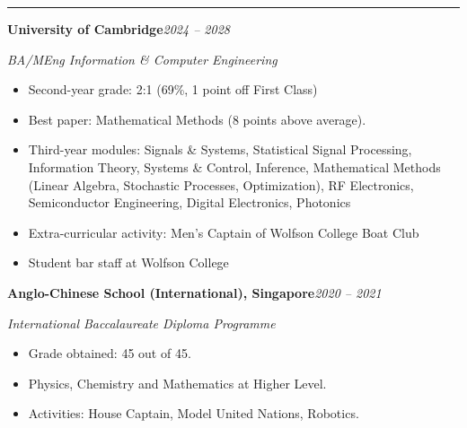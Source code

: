 \documentclass[11pt]{article}
\newcommand{\cvsection}[1]{%
  \vspace{10pt}%
  \noindent{\large\bfseries\MakeUppercase{#1}}\par
  \vspace{-4pt}\noindent\rule{\linewidth}{0.7pt}\vspace{4pt}%
}
\begin{document}
\cvsection{Education}

\noindent\textbf{University of Cambridge}\hfill\textit{2024 -- 2028}\par
\textit{BA/MEng Information \& Computer Engineering}
\begin{itemize}
  \item Second-year grade: 2:1 (69\%, 1 point off First Class)
  \item Best paper: Mathematical Methods (8 points above average).
  \item Third-year modules: Signals \& Systems, Statistical Signal Processing, Information Theory, Systems \& Control, Inference, Mathematical Methods (Linear Algebra, Stochastic Processes, Optimization), RF Electronics, Semiconductor Engineering, Digital Electronics, Photonics
  \item Extra-curricular activity: Men's Captain of Wolfson College Boat Club
  \item Student bar staff at Wolfson College
\end{itemize}

\vspace{4pt}
\noindent\textbf{Anglo-Chinese School (International), Singapore}\hfill\textit{2020 -- 2021}\par
\textit{International Baccalaureate Diploma Programme}
\begin{itemize}
  \item Grade obtained: 45 out of 45.
  \item Physics, Chemistry and Mathematics at Higher Level.
  \item Activities: House Captain, Model United Nations, Robotics.
\end{itemize}
\end{document}
